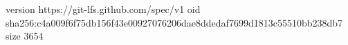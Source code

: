version https://git-lfs.github.com/spec/v1
oid sha256:c4a009f6f75db156f43e00927076206dae8ddedaf7699d1813c55510bb238db7
size 3654

